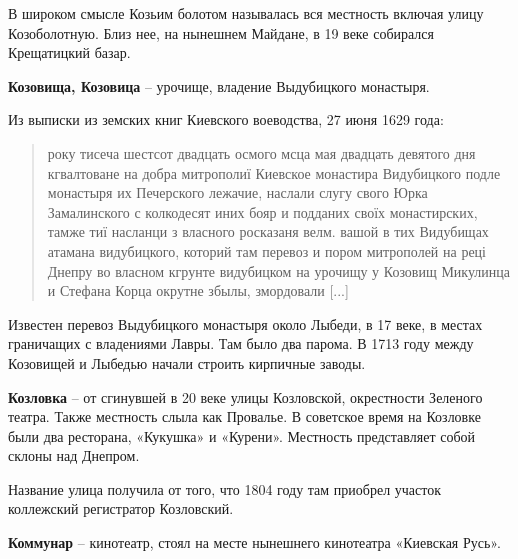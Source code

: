 В широком смысле Козьим болотом называлась вся местность включая улицу Козоболотную. Близ нее, на нынешнем Майдане, в 19 веке собирался Крещатицкий базар.\\

\medskip



\textbf{Козовища, Козовица} – урочище, владение Выдубицкого монастыря.

Из выписки из земских книг Киевского воеводства, 27 июня 1629 года:

\begin{quotation}
року тисеча шестсот двадцать осмого мсца мая двадцать девятого дня кгвалтоване на добра митрополиї Киевское монастира Видубицкого подле монастыря их Печерского лежачие, наслали слугу свого Юрка Замалинского с колкодесят иних бояр и подданих своїх монастирских, тамже тиї насланци з власного росказаня велм. вашой в тих Видубищах атамана видубицкого, которий там перевоз и пором митрополей на реці Днепру во власном кгрунте видубицком на урочищу у Козовищ Микулинца и Стефана Корца окрутне збылы, змордовали [...] 
\end{quotation}


Известен перевоз Выдубицкого монастыря около Лыбеди, в 17 веке, в местах граничащих с владениями Лавры. Там было два парома. В 1713 году между Козовищей и Лыбедью начали строить кирпичные заводы.\\

\medskip


\textbf{Козловка} – от сгинувшей в 20 веке улицы Козловской, окрестности Зеленого театра. Также местность слыла как Провалье. В советское время на Козловке были два ресторана, «Кукушка» и «Курени». Местность представляет собой склоны над Днепром.

Название улица получила от того, что 1804 году там приобрел участок коллежский регистратор Козловский.\\

\medskip


\textbf{Коммунар} – кинотеатр, стоял на месте нынешнего кинотеатра «Киевская Русь».\\

